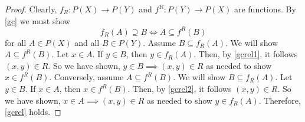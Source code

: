 \documentclass[
  twoside,
  12pt,
  letterpaper,
  fleqn]{article}
\theoremstyle{definition}
\theoremstyle{definition}
\theoremstyle{plain}
\theoremstyle{remark}
\begin{document}
\begin{proof}

Clearly, \(f_R:P(X)\to P(Y)\) and \(f^R:P(Y)\to P(X)\) are functions. By
\eqref{gc} we must show \begin{equation}
\label{gcrel}
f_R(A)\supseteq B \Longleftrightarrow A\subseteq f^R(B)
\end{equation} for all \(A\in P(X)\) and all \(B\in P(Y)\). Assume
\(B\subseteq f_R(A)\). We will show \(A\subseteq f^R(B)\). Let
\(x\in A\). If \(y\in B\), then \(y\in f_R(A)\). Then, by
\eqref{gcrel1}, it follows \((x,y)\in R\). So we have shown,
\(y\in B\implies (x,y)\in R\) as needed to show \(x\in f^R(B)\).
Conversely, assume \(A\subseteq f^R(B)\). We will show
\(B\subseteq f_R(A)\). Let \(y\in B\). If \(x\in A\), then
\(x\in f^R(B)\). Then, by \eqref{gcrel2}, it follows \((x,y)\in R\). So
we have shown, \(x\in A\implies (x,y)\in R\) as needed to show
\(y\in f_R(A)\). Therefore, \eqref{gcrel} holds.

\end{proof}


\printbibliography



\thispagestyle{empty}
\end{document}
